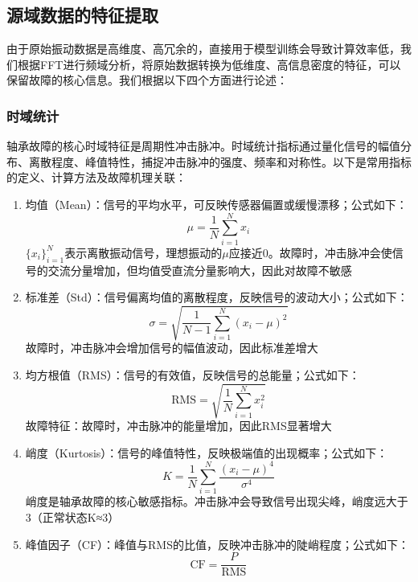 \documentclass[a4paper]{CPIPC}
\numberwithin{equation}{section}
\begin{document}
\subsection{源域数据的特征提取}
由于原始振动数据是高维度、高冗余的，直接用于模型训练会导致计算效率低，我们根据FFT进行频域分析，将原始数据转换为低维度、高信息密度的特征，可以保留故障的核心信息。我们根据以下四个方面进行论述：
\subsubsection{时域统计}
轴承故障的核心时域特征是周期性冲击脉冲。时域统计指标通过量化信号的幅值分布、离散程度、峰值特性，捕捉冲击脉冲的强度、频率和对称性。以下是常用指标的定义、计算方法及故障机理关联：

\begin{enumerate}
    \item 均值（Mean）：信号的平均水平，可反映传感器偏置或缓慢漂移；公式如下：
     \begin{equation}
      \mu = \frac{1}{N} \sum_{i=1}^{N} x_i
    \end{equation}
    $\{x_i\}_{i=1}^{N}$表示离散振动信号，理想振动的$\mu$应接近0。故障时，冲击脉冲会使信号的交流分量增加，但均值受直流分量影响大，因此对故障不敏感
    \item 标准差（Std）：信号偏离均值的离散程度，反映信号的波动大小；公式如下：
     \begin{equation}
       \sigma = \sqrt{\frac{1}{N - 1} \sum_{i=1}^{N} (x_i - \mu)^2}
    \end{equation}
    故障时，冲击脉冲会增加信号的幅值波动，因此标准差增大
    \item 均方根值（RMS）：信号的有效值，反映信号的总能量；公式如下：
    \begin{equation}
        \text{RMS} = \sqrt{\frac{1}{N} \sum_{i=1}^{N} x_i^2}
    \end{equation}
    故障特征：故障时，冲击脉冲的能量增加，因此RMS显著增大
    \item 峭度（Kurtosis）：信号的峰值特性，反映极端值的出现概率；公式如下：
    \begin{equation}
        K = \frac{1}{N} \sum_{i=1}^{N} \frac{(x_i - \mu)^4}{\sigma^4} 
    \end{equation}
    峭度是轴承故障的核心敏感指标。冲击脉冲会导致信号出现尖峰，峭度远大于3（正常状态K≈3）
    \item 峰值因子（CF）：峰值与RMS的比值，反映冲击脉冲的陡峭程度；公式如下：
    \begin{equation}
       \text{CF} = \frac{P}{\text{RMS}}

\end{equation}
\end{enumerate}
\end{document}
